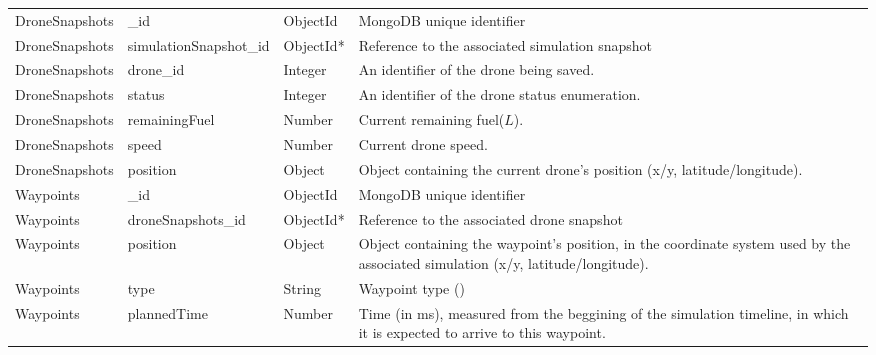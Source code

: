 \begin{tabularx}{\textwidth}{|l|l|l|X|}
\hline

DroneSnapshots	&	\_id	&	ObjectId	&	MongoDB unique identifier\\
DroneSnapshots	&	simulationSnapshot\_id	&	ObjectId*	&	Reference to the associated simulation snapshot\\
DroneSnapshots	&	drone\_id	&	Integer	&	An identifier of the drone being saved.\\
DroneSnapshots	&	status		&	Integer	&	An identifier of the drone status enumeration.\\
DroneSnapshots	&	remainingFuel	&	Number	&	Current remaining fuel($L$).\\
DroneSnapshots	&	speed	&	Number	&	Current drone speed.\\
DroneSnapshots	&	position	&	Object	&	Object containing the current drone's position (x/y, latitude/longitude).\\

\hline

Waypoints	&	\_id	&	ObjectId	&	MongoDB unique identifier\\
Waypoints	&	droneSnapshots\_id	&	ObjectId*	&	Reference to the associated drone snapshot\\
Waypoints	&	position	&	Object	&	Object containing the waypoint's position, in the coordinate system used by the associated simulation (x/y, latitude/longitude).\\
Waypoints	&	type	&	String	&	Waypoint type ()\\
Waypoints	&	plannedTime	&	Number	&	Time (in ms), measured from the beggining of the simulation timeline, in which it is expected to arrive to this waypoint.\\
 	
\end{tabularx}
